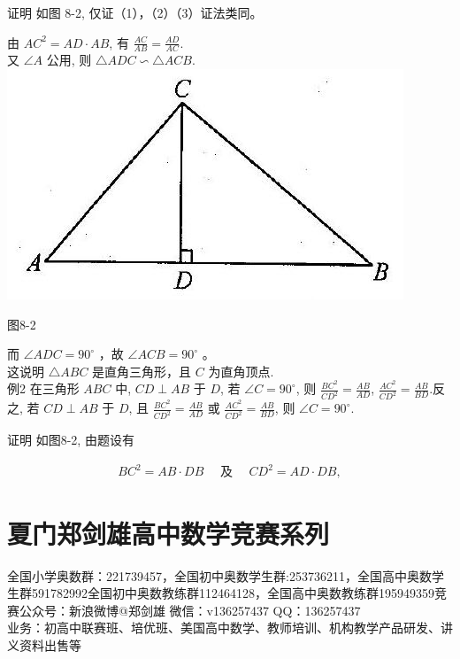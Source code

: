 \documentclass[10pt]{article}
\begin{document}
证明 如图 8-2, 仅证（1），（2）（3）证法类同。

由 $A C^{2}=A D \cdot A B$, 有 $\frac{A C}{A B}=\frac{A D}{A C}$.\\
又 $\angle A$ 公用, 则 $\triangle A D C \backsim \triangle A C B$.\\
\includegraphics[max width=\textwidth, center]{2024_10_30_2c8f45efd4a519b08e1ag-081}

图8-2

而 $\angle A D C=90^{\circ}$ ，故 $\angle A C B=90^{\circ}$ 。\\
这说明 $\triangle A B C$ 是直角三角形，且 $C$ 为直角顶点.\\
例2 在三角形 $A B C$ 中, $C D \perp A B$ 于 $D$, 若 $\angle C=90^{\circ}$, 则 $\frac{B C^{2}}{C D^{2}}=\frac{A B}{A D}$, $\frac{A C^{2}}{C D^{2}}=\frac{A B}{B D}$.反之, 若 $C D \perp A B$ 于 $D$, 且 $\frac{B C^{2}}{C D^{2}}=\frac{A B}{A D}$ 或 $\frac{A C^{2}}{C D^{2}}=\frac{A B}{B D}$, 则 $\angle C=90^{\circ}$.

证明 如图8-2, 由题设有

\begin{align*}
B C^{2}=A B \cdot D B \quad \text { 及 } \quad C D^{2}=A D \cdot D B,
\end{align*}

\section*{夏门郑剑雄高中数学竞赛系列}
全国小学奥数群：221739457，全国初中奥数学生群:253736211，全国高中奥数学生群591782992全国初中奥数教练群112464128，全国高中奥数教练群195949359竞赛公众号：新浪微博@郑剑雄 微信：v136257437 QQ：136257437\\
业务：初高中联赛班、培优班、美国高中数学、教师培训、机构教学产品研发、讲义资料出售等
\end{document}
